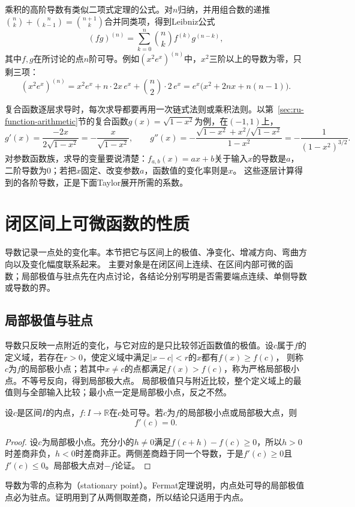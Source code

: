 乘积的高阶导数有类似二项式定理的公式。对$n$归纳，并用组合数的递推$\binom nk+\binom n{k-1}=\binom{n+1}k$合并同类项，得到Leibniz公式
\[
 (fg)^{(n)}=\sum_{k=0}^n\binom nkf^{(k)}g^{(n-k)},
\]
其中$f,g$在所讨论的点$n$阶可导。例如$(x^2e^x)^{(n)}$中，$x^2$三阶以上的导数为零，只剩三项：
\[
 (x^2e^x)^{(n)}=x^2e^x+n\cdot2x\,e^x+\binom n2\cdot2\,e^x=e^x\bigl(x^2+2nx+n(n-1)\bigr).
\]

复合函数逐层求导时，每次求导都要再用一次链式法则或乘积法则。以第~\ref{sec:ru-function-arithmetic}节的复合函数$g(x)=\sqrt{1-x^2}$为例，在$(-1,1)$上，
\[
 g'(x)=\frac{-2x}{2\sqrt{1-x^2}}=-\frac x{\sqrt{1-x^2}},\qquad
 g''(x)=-\frac{\sqrt{1-x^2}+x^2/\sqrt{1-x^2}}{1-x^2}=-\frac1{(1-x^2)^{3/2}}.
\]
对参数函数族，求导的变量要说清楚：$f_{a,b}(x)=ax+b$关于输入$x$的导数是$a$，二阶导数为$0$；若把$x$固定、改变参数$a$，函数值的变化率则是$x$。
这些逐层计算得到的各阶导数，正是下面Taylor展开所需的系数。
\section{闭区间上可微函数的性质}
\label{sec:ru-interval-differentiable}

导数记录一点处的变化率。本节把它与区间上的极值、净变化、增减方向、弯曲方向以及变化幅度联系起来。
主要对象是在闭区间上连续、在区间内部可微的函数；局部极值与驻点先在内点讨论，各结论分别写明是否需要端点连续、单侧导数或导数的界。

\subsection{局部极值与驻点}
\label{sec:ru-local-extrema}

导数只反映一点附近的变化，与它对应的是只比较邻近函数值的极值。设$c$属于$f$的定义域，若存在$r>0$，使定义域中满足$|x-c|<r$的$x$都有$f(x)\geq f(c)$，
则称$c$为$f$的局部极小点；若其中$x\neq c$的点都满足$f(x)>f(c)$，称为严格局部极小点。不等号反向，得到局部极大点。
局部极值只与附近比较，整个定义域上的最值则与全部输入比较；最小点一定是局部极小点，反之不然。
\begin{theorem}[Fermat定理]
\label{thm:analysis-fermat}
设$c$是区间$I$的内点，$f:I\to\mathbb R$在$c$处可导。若$c$为$f$的局部极小点或局部极大点，则
\begin{equation}
 f'(c)=0.
 \label{eq:analysis-scalar-first-order-necessary}
\end{equation}
\end{theorem}
\begin{proof}
设$c$为局部极小点。充分小的$h\neq0$满足$f(c+h)-f(c)\geq0$，所以$h>0$时差商非负，$h<0$时差商非正。两侧差商趋于同一个导数，于是$f'(c)\geq0$且$f'(c)\leq0$。局部极大点对$-f$论证。
\end{proof}
导数为零的点称为（stationary point）。Fermat定理说明，内点处可导的局部极值点必为驻点。证明用到了从两侧取差商，所以结论只适用于内点。

